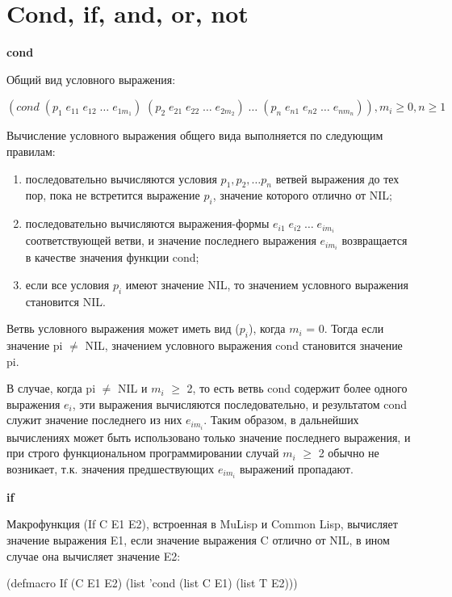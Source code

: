 \documentclass[12pt]{report}
\begin{document}
\section*{Cond, if, and, or, not}

\textbf{cond}

Общий вид условного выражения:

$(cond \; (p_1  \; e_{11}  \;  e_{12}  \;  …  \;  e_{1m_1})  \;  (p_2  \;  e_{21} \;  e_{22}  \;  …  \;  e_{2m_2})  \;  …  \;  (p_n  \; e_{n1} \;  e_{n2} \;  …  \; e_{nm_n})), m_i \geqslant 0 , n \geqslant 1$

Вычисление условного выражения общего вида выполняется по  следующим правилам:

\begin{enumerate}
	\item последовательно вычисляются условия $p_1, p_2, … p_n$ ветвей выражения до тех пор, пока не встретится выражение $p_i$, значение   которого отлично от NIL;
	\item последовательно вычисляются выражения-формы $e_{i1} \;  e_{i2} \;  … \;  e_{im_i}$ соответствующей ветви, и значение последнего выражения $e_{im_i}$ возвращается в качестве значения функции cond;
	\item если все условия $p_i$ имеют значение NIL, то значением условного выражения становится NIL.
\end{enumerate}

Ветвь условного выражения может иметь вид ($p_i$), когда $m_i$ = 0. Тогда если значение pi $\neq$ NIL, значением условного выражения cond становится значение pi.

В случае, когда pi $\neq$ NIL и $m_i$ $\geqslant$ 2, то есть ветвь cond содержит более  одного выражения $e_i$, эти выражения вычисляются последовательно, и  результатом cond служит значение последнего из них $e_{im_i}$. Таким  образом, в дальнейших вычислениях может быть использовано только значение последнего выражения, и при строго функциональном  программировании случай $m_i$ $\geqslant$ 2 обычно не возникает, т.к. значения  предшествующих $e_{im_i}$ выражений пропадают. 


 
\textbf{if}

Макрофункция (If C E1 E2), встроенная в MuLisp и Common Lisp, вычисляет значение выражения E1, если значение выражения C отлично от NIL, в ином случае она вычисляет значение E2:

(defmacro If (C E1 E2) (list 'cond (list C E1) (list T E2)))
\end{document}
